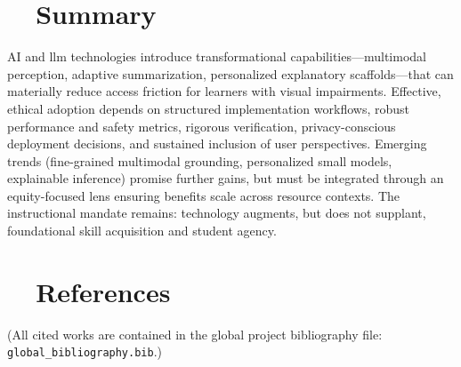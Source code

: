 \section{~~Summary}\label{ch9:sec:summary}
AI and \gls{llm} technologies introduce transformational capabilities—multimodal perception, adaptive summarization, personalized explanatory scaffolds—that can materially reduce access friction for learners with visual impairments.\supercite{SeeingAI, msseeingai, VoiceDreamScanner} Effective, ethical adoption depends on structured implementation workflows, robust performance and safety metrics, rigorous verification, privacy-conscious deployment decisions, and sustained inclusion of user perspectives.\supercite{AI_Ethics_Bias, DataPrivacyAI} Emerging trends (fine-grained multimodal grounding, personalized small models, explainable inference) promise further gains, but must be integrated through an equity-focused lens ensuring benefits scale across resource contexts. The instructional mandate remains: technology augments, but does not supplant, foundational skill acquisition and student agency.

\section{~~References}\label{ch9:sec:references}
\noindent (All cited works are contained in the global project bibliography file: \texttt{global\_bibliography.bib}.)
